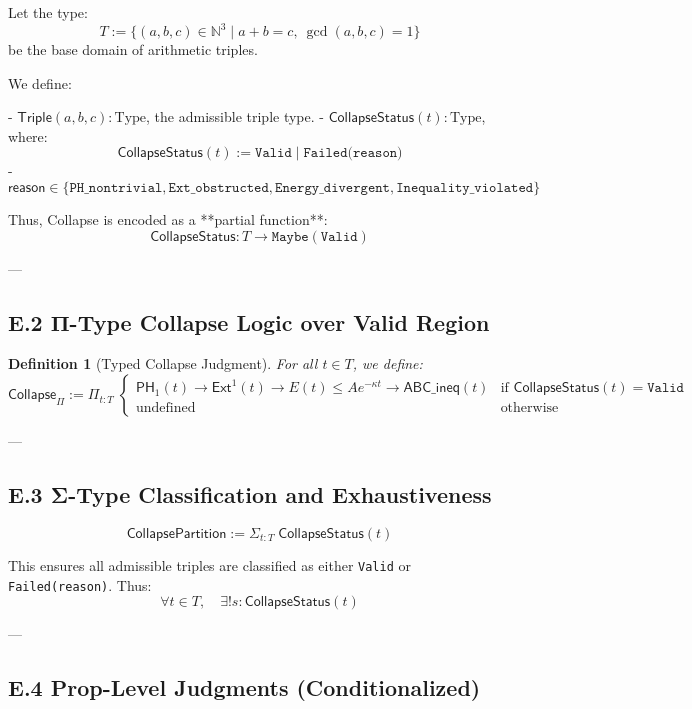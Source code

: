 \documentclass[11pt]{article}
\newtheorem{definition}[theorem]{Definition}
\begin{document}
Let the type:
\[
T := \{ (a,b,c) \in \mathbb{N}^3 \mid a + b = c,\ \gcd(a,b,c)=1 \}
\]
be the base domain of arithmetic triples.

We define:

- \( \mathsf{Triple}(a,b,c) : \mathrm{Type} \), the admissible triple type.
- \( \mathsf{CollapseStatus}(t) : \mathrm{Type} \), where:
  \[
  \mathsf{CollapseStatus}(t) := \texttt{Valid} \;|\; \texttt{Failed(reason)}
  \]
- \( \mathsf{reason} \in \{ \texttt{PH\_nontrivial}, \texttt{Ext\_obstructed}, \texttt{Energy\_divergent}, \texttt{Inequality\_violated} \} \)

Thus, Collapse is encoded as a **partial function**:
\[
\mathsf{CollapseStatus} : T \to \texttt{Maybe}(\texttt{Valid})
\]

---

\subsection*{E.2 Π-Type Collapse Logic over Valid Region}

\begin{definition}[Typed Collapse Judgment]
For all \( t \in T \), we define:
\[
\mathsf{Collapse}_\Pi := \Pi_{t:T} \;
\begin{cases}
\mathsf{PH}_1(t) \to \mathsf{Ext}^1(t) \to E(t) \leq Ae^{-\kappa t} \to \mathsf{ABC\_ineq}(t) & \text{if } \mathsf{CollapseStatus}(t) = \texttt{Valid} \\
\text{undefined} & \text{otherwise}
\end{cases}
\]
\end{definition}

---

\subsection*{E.3 Σ-Type Classification and Exhaustiveness}

\[
\mathsf{CollapsePartition} := \Sigma_{t:T} \; \mathsf{CollapseStatus}(t)
\]

This ensures all admissible triples are classified as either \texttt{Valid} or \texttt{Failed(reason)}.  
Thus:
\[
\forall t \in T, \quad \exists! s : \mathsf{CollapseStatus}(t)
\]

---

\subsection*{E.4 Prop-Level Judgments (Conditionalized)}
\end{document}
